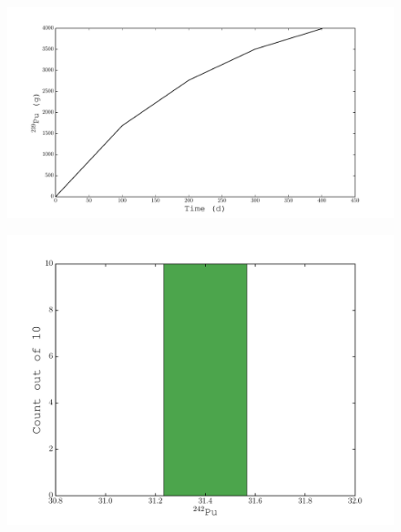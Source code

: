 \documentclass{beamer}
\begin{document}
\begin{frame}
    \begin{figure}[H]
    \begin{center}
      \hspace*{-0.6cm}\includegraphics[width=1.1\columnwidth]{../Origen2/PLOTS/PU239Post_XY.pdf}
      \vspace{-5mm}
    \end{center}
  \end{figure}
\end{frame}


\begin{frame}
  \begin{figure}[H]
    \begin{center}
      \includegraphics[width=0.77\columnwidth]{../Origen2/PLOTS/PU242Post_HIST.pdf}
      \vspace{-5mm}
      \label{fig:POSTHISTPu242}
    \end{center}
  \end{figure}
\end{frame}
  
\end{document}
